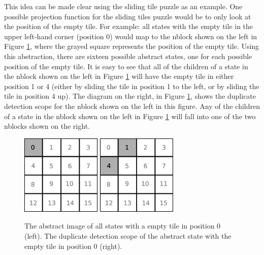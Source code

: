 \documentclass{article}
\begin{document}
This idea can be made clear using the sliding tile puzzle as an
example.  One possible projection function for the sliding tiles
puzzle would be to only look at the position of the empty tile.  For
example: all states with the empty tile in the upper left-hand corner
(position 0) would map to the nblock shown on the left in Figure
\ref{fig:tile-abstraction}, where the grayed square represents the
position of the empty tile.  Using this abstraction, there are sixteen
possible abstract states, one for each possible position of the empty
tile.  It is easy to see that all of the children of a state in the
nblock shown on the left in Figure \ref{fig:tile-abstraction} will
have the empty tile in either position 1 or 4 (either by sliding the
tile in position 1 to the left, or by sliding the tile in position 4
up).  The diagram on the right, in Figure \ref{fig:tile-abstraction},
shows the duplicate detection scope for the nblock shown on the left
in this figure.  Any of the children of a state in the nblock shown on
the left in Figure \ref{fig:tile-abstraction} will fall into one of
the two nblocks shown on the right.

\begin{figure}[t]
  \begin{center}
    \includegraphics[width=1.5in]{images/tile-abstraction.eps}
    \hspace{4cm}
    \includegraphics[width=1.5in]{images/duplicate-detection-scope.eps}
    \caption{The abstract image of all states with a empty tile in
      position 0 (left).  The duplicate detection scope of the
      abstract state with the empty tile in position 0 (right).}
    \label{fig:tile-abstraction}
  \end{center}
\end{figure}
\end{document}

